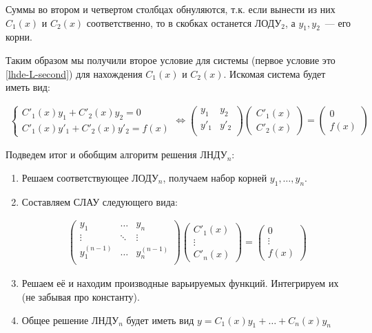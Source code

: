 Суммы во втором и четвертом столбцах обнуляются, т.к. если вынести из них
\(C_{1}(x)\) и \(C_{2}(x)\) соответственно, то в скобках останется ЛОДУ\(_2\),
а \(y_{1}, y_{2}\)~--- его корни.

Таким образом мы получили второе условие для системы (первое условие это
\ref{lhde-L-second}) для нахождения \(C_{1}(x)\) и \(C_{2}(x)\). Искомая
система будет иметь вид:

\begin{align*}
  \begin{cases}
    C'_{1}(x) y_{1} + C'_{2}(x) y_{2} = 0 \\
    C'_{1}(x) y'_{1} + C'_{2}(x) y'_{2} = f(x)
  \end{cases} \iff
  \begin{pmatrix}
    y_{1} & y_{2} \\
    y'_{1} & y'_{2} \\
  \end{pmatrix}
  \begin{pmatrix}
    C'_{1}(x) \\
    C'_{2}(x)
  \end{pmatrix}
  =
  \begin{pmatrix}
    0 \\
    f(x)
  \end{pmatrix}
\end{align*}

Подведем итог и обобщим алгоритм решения ЛНДУ\(_n\):
\begin{enumerate}
  \item Решаем соответствующее ЛОДУ\(_n\), получаем набор корней
  \(y_{1}, \dots, y_{n}\).

  \item Составляем СЛАУ следующего вида:
  
  \begin{align*}
    \begin{pmatrix}
      y_{1} & \dotsc & y_{n} \\
     \vdots & \ddots & \vdots \\
      y^{(n - 1)}_{1} & \dotsc & y^{(n - 1)}_{n} \\
    \end{pmatrix}
    \begin{pmatrix}
      C'_{1}(x) \\
      \vdots \\
      C'_{n}(x)
    \end{pmatrix}
    =
    \begin{pmatrix}
      0 \\
      \vdots \\
      f(x)
    \end{pmatrix}
  \end{align*}

  \item Решаем её и находим производные варьируемых функций. Интегрируем их
  (не забывая про константу).

  \item Общее решение ЛНДУ\(_n\) будет иметь вид
  \(y = C_{1}(x) y_{1} + \dotsc + C_{n}(x) y_{n}\)
\end{enumerate}
